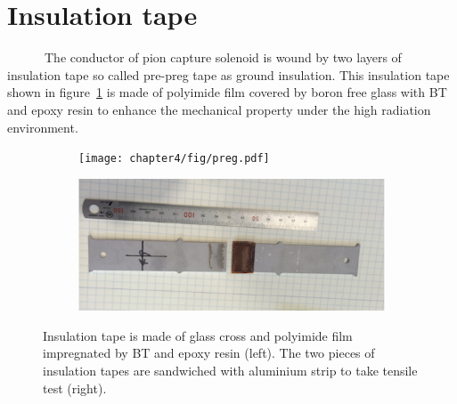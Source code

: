 \section{Insulation tape}
~~~~~~The conductor of pion capture solenoid is wound by two layers of insulation tape so called pre-preg tape as ground insulation.
This insulation tape shown in figure~\ref{3stur} is made of polyimide film covered by boron free glass with BT and epoxy resin to enhance the mechanical property under the high radiation environment.
 \begin{figure}[H]
  \begin{subfigure}{0.3\textwidth}
  \centering
  \texttt{[image: chapter4/fig/preg.pdf]}
  \end{subfigure}
  \hspace{0.2\textwidth}
  \begin{subfigure}{0.3\textwidth}
  \centering
  \includegraphics[scale=0.30]{chapter4/fig/BUGT.pdf}
  \end{subfigure}
  \caption{Insulation tape is made of glass cross and polyimide film impregnated by BT and epoxy resin (left). The two pieces of insulation tapes are sandwiched with aluminium strip to take tensile test (right).}
 \label{3stur}
 \end{figure}
